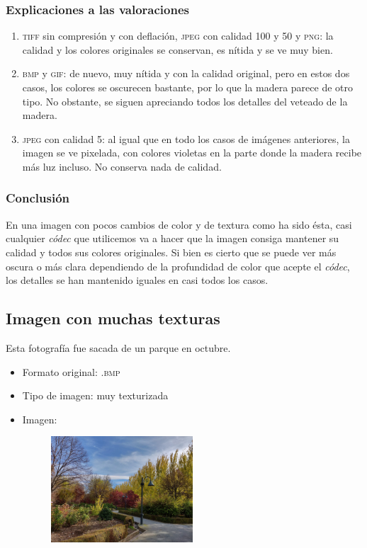 \documentclass[11pt,a4paper]{article}
\begin{document}
\subsubsection{Explicaciones a las valoraciones}
\begin{enumerate}
	\item \textsc{tiff} sin compresión y con deflación, \textsc{jpeg} con calidad 100 y 50 y \textsc{png}: la calidad y los colores originales se conservan, es nítida y se ve muy bien.
	\item \textsc{bmp} y \textsc{gif}: de nuevo, muy nítida y con la calidad original, pero en estos dos casos, los colores se oscurecen bastante, por lo que la madera parece de otro tipo. No obstante, se siguen apreciando todos los detalles del veteado de la madera.
	\item \textsc{jpeg} con calidad 5: al igual que en todo los casos de imágenes anteriores, la imagen se ve pixelada, con colores violetas en la parte donde la madera recibe más luz incluso. No conserva nada de calidad.
\end{enumerate}

\subsubsection{Conclusión}

En una imagen con pocos cambios de color y de textura como ha sido ésta, casi cualquier \textit{códec} que utilicemos va a hacer que la imagen consiga mantener su calidad y todos sus colores originales. Si bien es cierto que se puede ver más oscura o más clara dependiendo de la profundidad de color que acepte el \textit{códec}, los detalles se han mantenido iguales en casi todos los casos. 

\newpage

\subsection{Imagen con muchas texturas}

Esta fotografía fue sacada de un parque en octubre.

\begin{itemize}
	\item Formato original: \textsc{.bmp}
	\item Tipo de imagen: muy texturizada
	\item Imagen:
		\begin{figure}[H]
		\centering
			\includegraphics[width=0.5\textwidth]{Fotos/texturas.jpg}
		\end{figure}	
\end{itemize}
\end{document}
